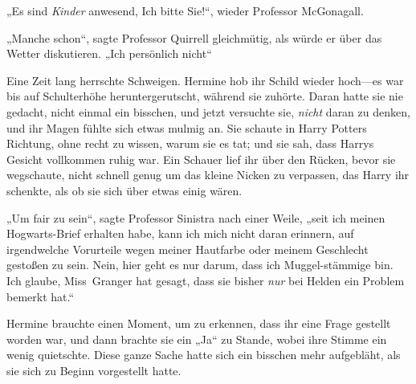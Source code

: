 „Es sind \emph{Kinder} anwesend, Ich bitte Sie!“, wieder Professor McGonagall.

„Manche schon“, sagte Professor Quirrell gleichmütig, als würde er über das Wetter diskutieren.
„Ich persönlich nicht“

Eine Zeit lang herrschte Schweigen. Hermine hob ihr Schild wieder hoch—es war bis auf Schulterhöhe heruntergerutscht, während sie zuhörte. Daran hatte sie nie gedacht, nicht einmal ein bisschen, und jetzt versuchte sie, \emph{nicht} daran zu denken, und ihr Magen fühlte sich etwas mulmig an. Sie schaute in Harry Potters Richtung, ohne recht zu wissen, warum sie es tat; und sie sah, dass Harrys Gesicht vollkommen ruhig war. Ein Schauer lief ihr über den Rücken, bevor sie wegschaute, nicht schnell genug um das kleine Nicken zu verpassen, das Harry ihr schenkte, als ob sie sich über etwas einig wären.

„Um fair zu sein“, sagte Professor Sinistra nach einer Weile, „seit ich meinen Hogwarts-Brief erhalten habe, kann ich mich nicht daran erinnern, auf irgendwelche Vorurteile wegen meiner Hautfarbe oder meinem Geschlecht gestoßen zu sein. Nein, hier geht es nur darum, dass ich Muggel-stämmige bin. Ich glaube, Miss~Granger hat gesagt, dass sie bisher \emph{nur} bei Helden ein Problem bemerkt hat.“

Hermine brauchte einen Moment, um zu erkennen, dass ihr eine Frage gestellt worden war, und dann brachte sie ein
„Ja“ zu Stande, wobei ihre Stimme ein wenig quietschte. Diese ganze Sache hatte sich ein bisschen mehr aufgebläht, als sie sich zu Beginn vorgestellt hatte.

